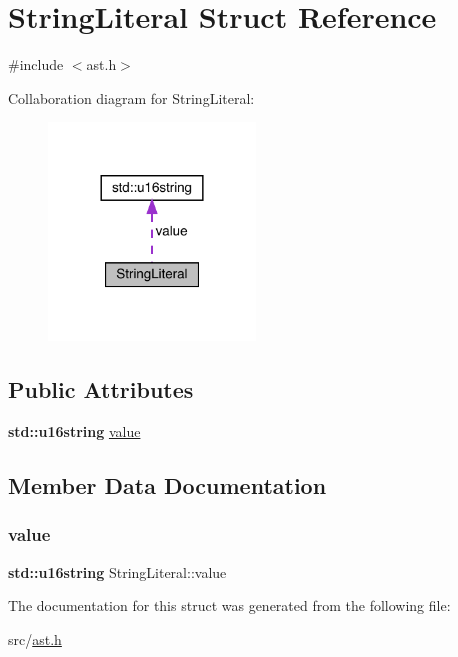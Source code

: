\hypertarget{struct_string_literal}{}\section{String\+Literal Struct Reference}
\label{struct_string_literal}


{\ttfamily \#include $<$ast.\+h$>$}



Collaboration diagram for String\+Literal\+:\nopagebreak
\begin{figure}[H]
\begin{center}
\leavevmode
\includegraphics[width=156pt]{struct_string_literal__coll__graph}
\end{center}
\end{figure}
\subsection*{Public Attributes}
\begin{DoxyCompactItemize}
\item 
\textbf{ std\+::u16string} \hyperlink{struct_string_literal_a6e41d06a20217417a1bf70171235a711}{value}
\end{DoxyCompactItemize}


\subsection{Member Data Documentation}
\mbox{\label{struct_string_literal_a6e41d06a20217417a1bf70171235a711}} 
\subsubsection{\texorpdfstring{value}{value}}
{\footnotesize\ttfamily \textbf{ std\+::u16string} String\+Literal\+::value}



The documentation for this struct was generated from the following file\+:\begin{DoxyCompactItemize}
\item 
src/\hyperlink{ast_8h}{ast.\+h}\end{DoxyCompactItemize}
